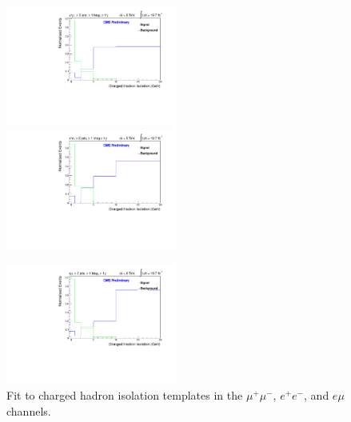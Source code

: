 \begin{figure}
\includegraphics[width=0.5\textwidth]{Plots/Fits/TTbarPhotonAnalysis/MuMu/central/FitTemplate.pdf}
\includegraphics[width=0.5\textwidth]{Plots/Fits/TTbarPhotonAnalysis/EE/central/FitTemplate.pdf}\\
\begin{center}
\includegraphics[width=0.5\textwidth]{Plots/Fits/TTbarPhotonAnalysis/EMu/central/FitTemplate.pdf}
\end{center}
\caption{Fit to charged hadron isolation templates in the $\mu^{+}\mu^{-}$, $e^{+}e^{-}$, and $e\mu$ channels.}
\label{fig-fitTemplates}
\end{figure}

